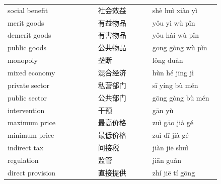 \documentclass[11pt]{article}
\begin{document}
\begin{longtable}{@{}p{0.40\linewidth}p{0.24\linewidth}p{0.30\linewidth}@{}}
social benefit & 社会效益 & shè huì xiào yì \\
merit goods & 有益物品 & yǒu yì wù pǐn \\
demerit goods & 有害物品 & yǒu hài wù pǐn \\
public goods & 公共物品 & gōng gòng wù pǐn \\
monopoly & 垄断 & lǒng duàn \\
mixed economy & 混合经济 & hùn hé jīng jì \\
private sector & 私营部门 & sī yíng bù mén \\
public sector & 公共部门 & gōng gòng bù mén \\
intervention & 干预 & gān yù \\
maximum price & 最高价格 & zuì gāo jià gé \\
minimum price & 最低价格 & zuì dī jià gé \\
indirect tax & 间接税 & jiàn jiē shuì \\
regulation & 监管 & jiān guǎn \\
direct provision & 直接提供 & zhí jiē tí gōng \\
\end{longtable}
\end{document}

